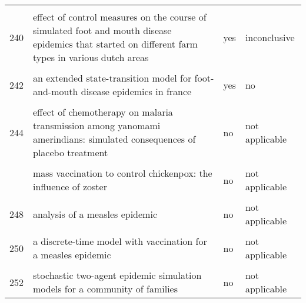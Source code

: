 \documentclass[
]{article}
\begin{document}
\begin{landscape}
\begin{longtable}{l>{\raggedright\arraybackslash}p{4cm}l>{\raggedright\arraybackslash}p{4cm}}
\cellcolor{gray!6}{239} & \cellcolor{gray!6}{a decision-tree to optimise control measures during the early stage of a foot-and-mouth disease epidemic} & \cellcolor{gray!6}{yes} & \cellcolor{gray!6}{no}\\
240 & effect of control measures on the course of simulated foot and mouth disease epidemics that started on different farm types in various dutch areas & yes & inconclusive\\
\addlinespace
\cellcolor{gray!6}{241} & \cellcolor{gray!6}{dynamics of the 2001 uk foot and mouth epidemic: stochastic dispersal in a heterogeneous landscape} & \cellcolor{gray!6}{yes} & \cellcolor{gray!6}{no}\\
242 & an extended state-transition model for foot-and-mouth disease epidemics in france & yes & no\\
\cellcolor{gray!6}{243} & \cellcolor{gray!6}{simulated economic consequences of foot-and-mouth disease epidemics and their public control in france} & \cellcolor{gray!6}{no} & \cellcolor{gray!6}{not applicable}\\
244 & effect of chemotherapy on malaria transmission among yanomami amerindians: simulated consequences of placebo treatment & no & not applicable\\
\cellcolor{gray!6}{245} & \cellcolor{gray!6}{modelling vaccination strategy against directly transmitted diseases using a series of pulses} & \cellcolor{gray!6}{no} & \cellcolor{gray!6}{not applicable}\\
\addlinespace
246 & mass vaccination to control chickenpox: the influence of zoster & no & not applicable\\
\cellcolor{gray!6}{247} & \cellcolor{gray!6}{an evaluation of alternate control strategies for foot-and-mouth disease in australia: a regional approach} & \cellcolor{gray!6}{yes} & \cellcolor{gray!6}{no}\\
248 & analysis of a measles epidemic & no & not applicable\\
\cellcolor{gray!6}{249} & \cellcolor{gray!6}{a model of the transmission of dengue fever with an evaluation of the impact of ultra-low volume (ulv) insecticide applications on dengue epidemics} & \cellcolor{gray!6}{no} & \cellcolor{gray!6}{not applicable}\\
250 & a discrete-time model with vaccination for a measles epidemic & no & not applicable\\
\addlinespace
\cellcolor{gray!6}{251} & \cellcolor{gray!6}{a stochastic model of epidemics in military recruits} & \cellcolor{gray!6}{no} & \cellcolor{gray!6}{not applicable}\\
252 & stochastic two-agent epidemic simulation models for a community of families & no & not applicable\\*
\end{longtable}
\endgroup{}
\end{landscape}
\end{document}
